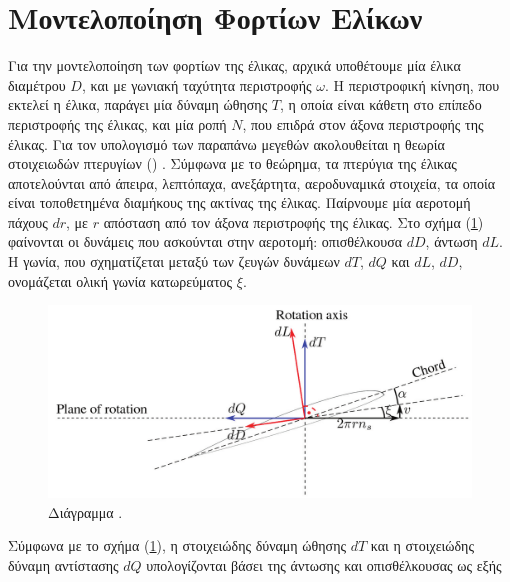 
\section{Μοντελοποίηση Φορτίων Ελίκων}
\label{sec:prop}
\noindent Για την μοντελοποίηση των φορτίων της έλικας, αρχικά υποθέτουμε μία 
έλικα διαμέτρου \(D\), και με γωνιακή ταχύτητα περιστροφής \(\omega\). Η 
περιστροφική κίνηση, που εκτελεί η έλικα, παράγει μία δύναμη ώθησης \(T\), η 
οποία είναι κάθετη στο επίπεδο περιστροφής της έλικας, και μία ροπή \(N\), που 
επιδρά στον άξονα περιστροφής της έλικας. Για τον υπολογισμό των παραπάνω 
μεγεθών ακολουθείται η θεωρία στοιχειωδών πτερυγίων () 
\cite{Bose2012}. 
Σύμφωνα με το θεώρημα, τα πτερύγια της έλικας αποτελούνται από άπειρα, 
λεπτόπαχα, ανεξάρτητα, αεροδυναμικά στοιχεία, τα οποία είναι τοποθετημένα 
διαμήκους της ακτίνας της έλικας. Παίρνουμε μία αεροτομή πάχους \(dr\), με
\(r\) απόσταση από τον άξονα περιστροφής της έλικας. Στο σχήμα (\ref{blade}) 
φαίνονται οι δυνάμεις που ασκούνται στην αεροτομή: οπισθέλκουσα \(dD\), άντωση 
\(dL\). Η γωνία, που σχηματίζεται μεταξύ των ζευγών δυνάμεων \(dT\), \(dQ\) και 
\(dL\), \(dD\), ονομάζεται ολική γωνία κατωρεύματος \(\xi\). 

\begin{figure}[htb!]
    \centering
    \includegraphics[width=\textwidth]{Propeller/blade_image.png}
    \caption{Διάγραμμα  \cite{automat}.}\label{blade}
\end{figure}

Σύμφωνα με το σχήμα (\ref{blade}), η στοιχειώδης δύναμη ώθησης \(dT\) και η 
στοιχειώδης δύναμη αντίστασης \(dQ\) υπολογίζονται βάσει της άντωσης και 
οπισθέλκουσας ως εξής

